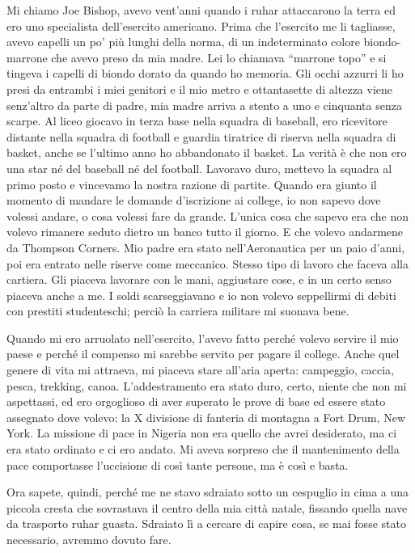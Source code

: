 Mi chiamo Joe Bishop, avevo vent'anni quando i ruhar attaccarono la
terra ed ero uno specialista dell'esercito americano. Prima che
l'esercito me li tagliasse, avevo capelli un po' più lunghi della norma,
di un indeterminato colore biondo-marrone che avevo preso da mia madre.
Lei lo chiamava ``marrone topo'' e si tingeva i capelli di biondo dorato
da quando ho memoria. Gli occhi azzurri li ho presi da entrambi i miei
genitori e il mio metro e ottantasette di altezza viene senz'altro da
parte di padre, mia madre arriva a stento a uno e cinquanta senza
scarpe. Al liceo giocavo in terza base nella squadra di baseball, ero
ricevitore distante nella squadra di football e guardia tiratrice di
riserva nella squadra di basket, anche se l'ultimo anno ho abbandonato
il basket. La verità è che non ero una star né del baseball né del
football. Lavoravo duro, mettevo la squadra al primo posto e vincevamo
la nostra razione di partite. Quando era giunto il momento di mandare le
domande d'iscrizione ai college, io non sapevo dove volessi andare, o
cosa volessi fare da grande. L'unica cosa che sapevo era che non volevo
rimanere seduto dietro un banco tutto il giorno. E che volevo andarmene
da Thompson Corners. Mio padre era stato nell'Aeronautica per un paio
d'anni, poi era entrato nelle riserve come meccanico. Stesso tipo di
lavoro che faceva alla cartiera. Gli piaceva lavorare con le mani,
aggiustare cose, e in un certo senso piaceva anche a me. I soldi
scarseggiavano e io non volevo seppellirmi di debiti con prestiti
studenteschi; perciò la carriera militare mi suonava bene.

Quando mi ero arruolato nell'esercito, l'avevo fatto perché volevo
servire il mio paese e perché il compenso mi sarebbe servito per pagare
il college. Anche quel genere di vita mi attraeva, mi piaceva stare
all'aria aperta: campeggio, caccia, pesca, trekking, canoa.
L'addestramento era stato duro, certo, niente che non mi aspettassi, ed
ero orgoglioso di aver superato le prove di base ed essere stato
assegnato dove volevo: la X divisione di fanteria di montagna a Fort
Drum, New York. La missione di pace in Nigeria non era quello che avrei
desiderato, ma ci era stato ordinato e ci ero andato. Mi aveva sorpreso
che il mantenimento della pace comportasse l'uccisione di così tante
persone, ma è così e basta.

Ora sapete, quindi, perché me ne stavo sdraiato sotto un cespuglio in
cima a una piccola cresta che sovrastava il centro della mia città
natale, fissando quella nave da trasporto ruhar guasta. Sdraiato lì a
cercare di capire cosa, se mai fosse stato necessario, avremmo dovuto
fare.

